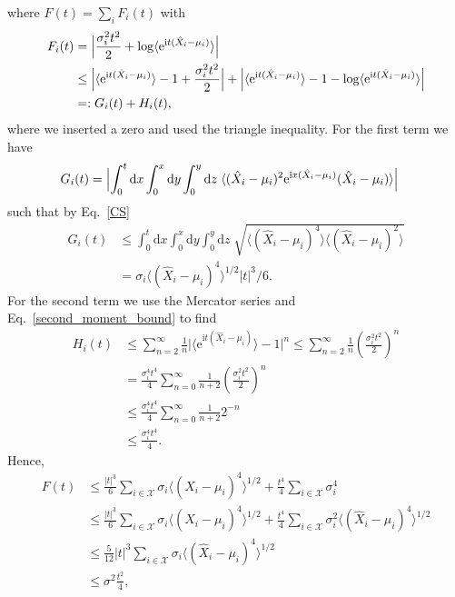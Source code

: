 \documentclass[aps,10pt,epsfig,graphics,mathbbm]{article}
\newcommand{\me}{\mathrm{e}}
\newcommand{\mi}{\mathrm{i}}
\newcommand{\md}{\mathrm{d}}
\begin{document}
where $F(t)=\sum_iF_i(t)$ with
\begin{equation}
\begin{split}
F_i(t)&=\Bigl|\frac{\sigma_i^2t^2}{2}+\log\langle\me^{\mi t(\hat{X}_i-\mu_i)}\rangle\Bigr|\\
&\le \Bigl|\langle\me^{\mi t(\hat{X}_i-\mu_i)}\rangle-1+\frac{\sigma_i^2t^2}{2}\Bigr|+\Bigl|\langle\me^{\mi t(\hat{X}_i-\mu_i)}\rangle-1-\log\langle\me^{\mi t(\hat{X}_i-\mu_i)}\rangle\Bigr|\\
&=:G_i(t)+H_i(t),
\end{split}
\end{equation}
where we inserted a zero and used the triangle inequality. 
For the first term we have
\begin{equation}
\begin{split}
G_i(t)&=\Bigl|\int_0^t\md x\int_0^x\md y\int_0^y\md z\;\langle  (\hat{X}_i-\mu_i)^2\me^{\mi x(\hat{X}_i-\mu_i)}(\hat{X}_i-\mu_i)\rangle\Bigr|
\end{split}
\end{equation}
such that by Eq.~\eqref{CS}
\begin{equation}
\begin{split}
G_i(t)&\le \int_0^t\md x\int_0^x\md y\int_0^y\md z\;\sqrt{\langle (\hat{X}_i-\mu_i)^4\rangle\langle(\hat{X}_i-\mu_i)^2 \rangle}\\
&=\sigma_i\langle (\hat{X}_i-\mu_i)^4\rangle^{1/2}|t|^3/6.
\end{split}
\end{equation}
For the second term we use the  Mercator series and Eq.~\eqref{second_moment_bound}  to find
\begin{equation}
\begin{split}
H_i(t)
&\le \sum_{n=2}^\infty\frac{1}{n}\bigl|\langle\me^{\mi t(\hat{X}_i-\mu_i)}\rangle-1\bigr|^n
\le \sum_{n=2}^\infty\frac{1}{n}\left(\frac{\sigma_i^2t^2}{2}\right)^n\\
&= \frac{\sigma_i^4t^4}{4}\sum_{n=0}^\infty\frac{1}{n+2}\left(\frac{\sigma_i^2t^2}{2}\right)^n\\
&\le \frac{\sigma_i^4t^4}{4}\sum_{n=0}^\infty\frac{1}{n+2}2^{-n}\\
&\le \frac{\sigma_i^4t^4}{4}.
\end{split}
\end{equation}
Hence,
\begin{equation}
\label{third_line}
\begin{split}
F(t)&\le \frac{|t|^3}{6}\sum_{i\in\mathcal{X}}\sigma_i\langle (\hat{X}_i-\mu_i)^4\rangle^{1/2}+\frac{t^4}{4}\sum_{i\in\mathcal{X}}\sigma_i^4\\
&\le \frac{|t|^3}{6}\sum_{i\in\mathcal{X}}\sigma_i\langle (\hat{X}_i-\mu_i)^4\rangle^{1/2}+\frac{t^4}{4}\sum_{i\in\mathcal{X}}\sigma_i^2\langle (\hat{X}_i-\mu_i)^4\rangle^{1/2}\\
&\le \frac{5}{12}|t|^3\sum_{i\in\mathcal{X}}\sigma_i\langle (\hat{X}_i-\mu_i)^4\rangle^{1/2}\\
&\le \sigma^2\frac{t^2}{4},
\end{split}
\end{equation}
\end{document}
